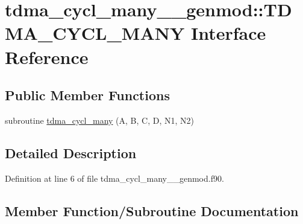 \hypertarget{interfacetdma__cycl__many____genmod_1_1_t_d_m_a___c_y_c_l___m_a_n_y}{}\section{tdma\+\_\+cycl\+\_\+many\+\_\+\+\_\+genmod\+::T\+D\+M\+A\+\_\+\+C\+Y\+C\+L\+\_\+\+M\+A\+NY Interface Reference}
\label{interfacetdma__cycl__many____genmod_1_1_t_d_m_a___c_y_c_l___m_a_n_y}
\subsection*{Public Member Functions}
\begin{DoxyCompactItemize}
\item 
subroutine \mbox{\hyperlink{interfacetdma__cycl__many____genmod_1_1_t_d_m_a___c_y_c_l___m_a_n_y_a79fd6de9075ce5de980158385900c5df}{tdma\+\_\+cycl\+\_\+many}} (A, B, C, D, N1, N2)
\end{DoxyCompactItemize}


\subsection{Detailed Description}


Definition at line 6 of file tdma\+\_\+cycl\+\_\+many\+\_\+\+\_\+genmod.\+f90.



\subsection{Member Function/\+Subroutine Documentation}
\mbox{\label{interfacetdma__cycl__many____genmod_1_1_t_d_m_a___c_y_c_l___m_a_n_y_a79fd6de9075ce5de980158385900c5df}} 
